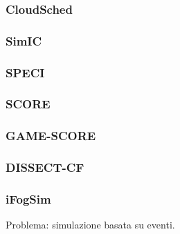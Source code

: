 {\subsubsection*{CloudSched}
\subsubsection*{SimIC}
\subsubsection*{SPECI}
\subsubsection*{SCORE}
\subsubsection*{GAME-SCORE}
\subsubsection*{DISSECT-CF}
\subsubsection*{iFogSim}
Problema: simulazione basata su eventi.
}